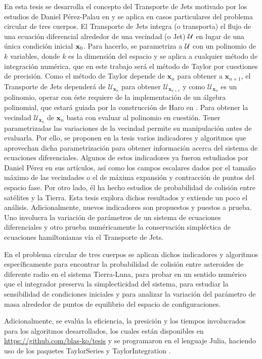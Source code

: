 En esta tesis se desarrolla el concepto del Transporte de Jets motivado por los estudios de Daniel Pérez-Palau en \cite{Perez2013, Perez2015} y se aplica en casos particulares del problema circular de tres cuerpos. El Transporte de Jets integra (o transporta) el flujo de una ecuación diferencial alrededor de una vecindad (o Jet) $\mathcal{U}$ en lugar de una única  condición inicial $\mathbf{x}_0$. Para hacerlo, se parametriza a $\mathcal{U}$ con un polinomio de $k$ variables, donde $k$ es la dimensión del espacio y se aplica a cualquier método de integración numérica, que en este trabajo será el método de Taylor por cuestiones de precisión. Como el método de Taylor depende de $\mathbf{x}_n$ para obtener a $\mathbf{x}_{n+1}$, el Transporte de Jets dependerá de $\mathcal{U}_{\mathbf{x}_n}$ para obtener $\mathcal{U}_{\mathbf{x}_{n+1}}$ y como $\mathcal{U}_{\mathbf{x}_n}$ es un polinomio, operar con éste requiere de la implementación de un álgebra polinomial, que estará guiada por la construcción de Haro en \cite{Haro2009}. Para obtener la vecindad $\mathcal{U}_{\mathbf{x}_n}$ de $\mathbf{x}_n$ basta con evaluar al polinomio en cuestión. Tener parametrizadas las variaciones de la vecindad permite su manipulación antes de evaluarla. Por ello, se proponen en la tesis varios indicadores y algoritmos que aprovechan dicha parametrización para obtener información acerca del sistema de ecuaciones diferenciales. Algunos de estos indicadores ya fueron estudiados por Daniel Pérez en sus artículos, así como los campos escalares dados por el tamaño máximo de las vecindades o el de máxima expansión y contracción de puntos del espacio fase. Por otro lado, él ha hecho estudios de probabilidad de colisión entre satélites y la Tierra. Esta tesis explora dichos resultados y extiende un poco el análisis. Adicionalmente, nuevos indicadores son propuestos y puestos a prueba. Uno involucra la variación de parámetros de un sistema de ecuaciones diferenciales y otro prueba numéricamente la conservación simpléctica de ecuaciones hamiltonianas vía el Transporte de Jets.


En el problema circular de tres cuerpos se aplican dichos indicadores y algoritmos específicamente para encontrar la probabilidad de colisión entre asteroides de diferente radio en el sistema Tierra-Luna, para probar en un sentido numérico que el integrador preserva la simplecticidad del sistema, para estudiar la sensibilidad de condiciones iniciales y para analizar la variación del parámetro de masa alrededor de puntos de equilibrio del espacio de configuraciones.  

Adicionalmente, se evalúa la eficiencia, la presición y los tiempos involucrados para los algoritmos desarrollados, los cuales están disponibles en \href{https://github.com/blas-ko/tesis}{https://github.com/blas-ko/tesis} y se programaron en el lenguaje Julia, haciendo uso de los paquetes \textsf{TaylorSeries} \cite{TaylorSeries} y \textsf{TaylorIntegration} \cite{TaylorIntegration}. 
